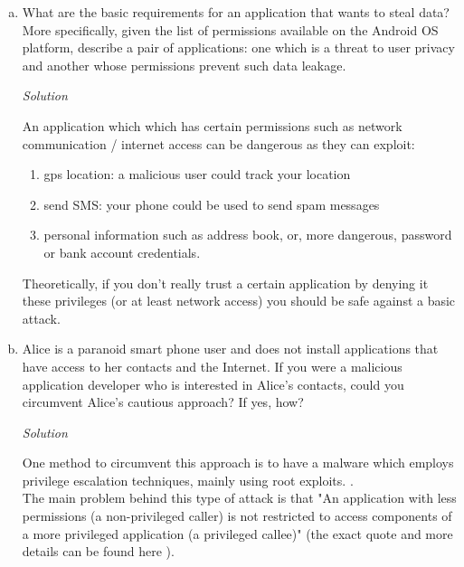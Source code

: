 \documentclass[a4paper,11pt]{article}
\newenvironment{solution}%
{\par\begin{minipage}{\linewidth}{\noindent\small\textit{Solution}\\}\begin{boxedminipage}{\linewidth}}%
{\end{boxedminipage}\end{minipage}\par\bigskip}
\begin{document}
\begin{enumerate} [(a)]
\item What are the basic requirements for an application that wants to steal
  data? More specifically, given the list of permissions available on the
  Android OS platform, describe a pair of applications: one which is a threat
  to user privacy and another whose permissions prevent such data leakage.
\ifsolution\begin{solution}
An application which which has certain permissions such as network communication / internet
access can be dangerous as they can exploit:
\begin{enumerate}
  \item gps location: a malicious user could track your location
  \item send SMS: your phone could be used to send spam messages
  \item personal information such as address book, or, more dangerous, password or
  bank account credentials.
\end{enumerate}

Theoretically, if you don't really trust a certain application by denying it these privileges
(or at least network access) you should be safe against a basic attack.
\end{solution}\fi


\item Alice is a paranoid smart phone user and does not install applications
  that have access to her contacts and the Internet. If you were a malicious
  application developer who is interested in Alice's contacts, could you
  circumvent Alice's cautious approach? If yes, how?
\ifsolution\begin{solution}
One method to circumvent this approach is to have a malware which employs privilege
escalation techniques, mainly using root exploits. \cite{AndroidVirus}.\\
The main problem behind this type of attack is that "An application with less permissions
(a non-privileged caller) is not restricted  to access components of a more privileged application
(a privileged callee)" (the exact quote and more details can be found here \cite{PermAttack}).
\end{solution}\fi

\end{enumerate}
\end{document}

